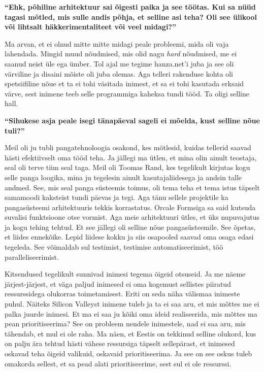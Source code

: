 \textbf{\enquote{Ehk, põhiline arhitektuur sai õigesti paika ja see töötas. Kui sa nüüd tagasi mõtled, mis sulle andis põhja, et selline asi teha? Oli see ülikool või lihtsalt häkkerimentaliteet või veel midagi?}}

Ma arvan, et ei olnud mitte mitte midagi peale probleemi, mida oli vaja lahendada. Mingid muud nõudmised, mis olid nagu \emph{hard} nõudmised, me ei saanud neist üle ega ümber. Tol ajal me tegime hanza.net'i juba ja see oli värviline ja disaini mõiste oli juba olemas. Aga telleri rakenduse kohta oli spetsiifiline nõue et ta ei tohi väsitada inimest, et sa ei tohi kasutada erksaid värve, sest inimene teeb selle programmiga kaheksa tundi tööd. Ta oligi selline hall.

\textbf{\enquote{Sihukese asja peale isegi tänapäeval sageli ei mõelda, kust selline nõue tuli?}}

Meil oli ju tubli pangatehnoloogia osakond, kes mõtlesid, kuidas tellerid saavad hästi efektiivselt oma tööd teha. Ja jällegi ma ütlen, et mina olin ainult teostaja, seal oli terve tiim seal taga. Meil oli Toomas Rand, kes tegelikult kirjutas kogu selle panga loogika, mina ju tegelesin ainult kasutajaliidesega ja andsin talle andmed. See, mis seal panga süsteemis toimus, oli tema teha et tema istus täpselt samamoodi kaksteist tundi päevas ja tegi. Aga tänu sellele projektile ka pangasüsteemi arhitektuuris tekkis korrastatus. Orcale Formsiga sa said kutsuda suvalisi funktsioone otse vormist. Aga meie arhitektuuri ütles, et üks nupuvajutus ja kogu tehing tehtud. Et see jällegi oli selline nõue pangasüsteemile. See õpetas, et liides ennekõike. Lepid liidese kokku ja siis osapooled saavad oma osaga  edasi tegeleda. See võimaldab sul testimist, testimise automatiseerimist, töö paralleliseerimist. 

Kitsendused tegelikult sunnivad inimesi tegema õigeid otsuseid. Ja me näeme järjest-järjest, et väga paljud inimesed ei oma kogemust sellistes piiratud  ressurssidega olukorras toimetamisest. Eriti on seda näha välismaa inimeste puhul. Näiteks Silicon Valleyst inimene tuleb ja ta ei saa aru, et mis mõttes me ei palka juurde inimesi. Et ma ei saa ju kõiki oma ideid realiseerida, mis mõttes ma pean prioritiseerima? See on probleem nendele inimestele, nad ei saa aru, mis tähendab, et mul ei ole raha. Ma näen, et Eestis on tekkinud selline olukord, kus on palju ära tehtud hästi vähese ressursiga täpselt sellepärast, et inimesed oskavad teha õigeid valikuid, oskavaid prioritiseerima. Ja see on see oskus tuleb omakorda sellest, et sa pead alati prioritiseerime, sest sul ei ole ressurssi.

